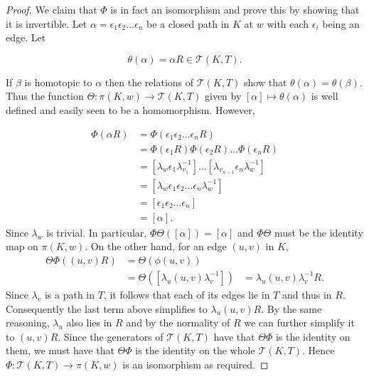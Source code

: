 \documentclass[12pt]{article}
\theoremstyle{definition}
\numberwithin{equation}{theorem}
\begin{document}
\begin{proof}
We claim that $\Phi$ is in fact an isomorphism and prove this by showing that it is invertible. Let $\alpha = \epsilon_1 \epsilon_2 \dots \epsilon_n$ be a closed path in $K$ at $w$ with each $\epsilon_i$ being an edge. Let

\begin{equation*}
\theta(\alpha) = \alpha R \in \mathcal{T}(K,T).
\end{equation*}

If $\beta$ is homotopic to $\alpha$ then the relations of $\mathcal{T}(K,T)$ show that $\theta(\alpha) = \theta(\beta)$. Thus the function $\Theta:\pi(K,w) \rightarrow \mathcal{T}(K,T)$ given by $[\alpha] \mapsto \theta(\alpha)$ is well defined and easily seen to be a homomorphism. However,

\begin{align*}
  \Phi(\alpha R) &= \Phi(\epsilon_1 \epsilon_2 \dots \epsilon_n R) \\
                 &= \Phi(\epsilon_1 R) \Phi(\epsilon_2 R) \dots \Phi(\epsilon_n R) \\
                 &= [\lambda_w \epsilon_1 \lambda_{v_1}^{-1}]  \dots [\lambda_{v_{n-1}}\epsilon_n \lambda_w^{-1}] \\
                 &= [\lambda_w\epsilon_1 \epsilon_2 \dots \epsilon_n \lambda_w^{-1}] \\
                 &= [\epsilon_1 \epsilon_2 \dots \epsilon_n] \\
                 &= [\alpha].
\end{align*}
Since $\lambda_w$ is trivial. In particular, $\Phi\Theta([\alpha]) = [\alpha]$ and $\Phi\Theta$ must be the identity map on $\pi(K,w)$. On the other hand, for an edge $(u,v)$ in $K$,
\begin{align*}
  \Theta\Phi((u,v) R) &= \Theta(\phi(u,v)) \\
                      &= \Theta([\lambda_u(u,v)\lambda_v^{-1}])
                      &= \lambda_u (u,v) \lambda_v^{-1} R.
\end{align*}
Since $\lambda_v$ is a path in $T$, it follows that each of its edges lie in $T$ and thus in $R$. Consequently the last term above simplifies to $\lambda_u(u,v)R$. By the same reasoning, $\lambda_u$ also lies in $R$ and by the normality of $R$ we can further simplify it to $(u,v) R$. Since the generators of $\mathcal{T}(K,T)$ have that $\Theta\Phi$ is the identity on them, we must have that $\Theta\Phi$ is the identity on the whole $\mathcal{T}(K,T)$. Hence $\Phi: \mathcal{T}(K,T) \rightarrow \pi(K,w)$ is an isomorphism as required.
\end{proof}
\end{document}
